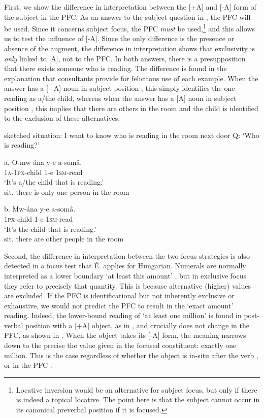 \documentclass[output=paper]{langsci/langscibook}
\begin{document}
  First, we show the difference in interpretation between the [+A] and [-A] form of the subject in the PFC. As an answer to the subject question in , the PFC will be used. Since it concerns subject focus, the PFC \textit{must} be used,\footnote{Locative inversion would be an alternative for subject focus, but only if there is indeed a topical locative. The point here is that the subject cannot occur in its canonical preverbal position if it is focused.} and this allows us to test the influence of [-A]. Since the only difference is the presence or absence of the augment, the difference in interpretation shows that exclusivity is \textit{only} linked to [A], not to the PFC. In both answers, there is a presupposition that there exists someone who is reading. The difference is found in the explanation that consultants provide for felicitous use of each example. When the answer has a [+A] noun in subject position , this simply identifies the one reading as a/the child, whereas when the answer has a [A] noun in subject position , this implies that there are others in the room and the child is identified to the exclusion of these alternatives.

\ea
{sketched situation: I want to know who is reading in the room next door}
\glt   Q: ‘Who is reading?’
\z

\ea
\gll   a.  O-mw-ána  y-e  a-somâ.\\
         \textsc{1a}-\textsc{1px}-child  1-e  \textsc{1sm}-read\\
\glt     ‘It’s a/the child that is reading.’\\
sit. there is only one person in the room
\z

\ea
\gll   b.  Mw-ána  y-e  a-somâ.\\
         \textsc{1px}-child  1-e  \textsc{1sm}-read\\
\glt   ‘It’s the child that is reading.’\\
sit. there are other people in the room
\z

Second, the difference in interpretation between the two focus strategies is also detected in a focus test that É. \citet{Kiss2009} applies for Hungarian. Numerals are normally interpreted as a lower boundary ‘at least this amount’ \citep{Horn1972,Levinson2000}, but in exclusive focus they refer to precisely that quantity. This is because alternative (higher) values are excluded. If the PFC is identificational but not inherently exclusive or exhaustive, we would not predict the PFC to result in the ‘exact amount’ reading. Indeed, the lower-bound reading of ‘at least one million’ is found in post-verbal position with a [+A] object, as in , and crucially does not change in the PFC, as shown in . When the object takes its [-A] form, the meaning narrows down to the precise the value given in the focused constituent: exactly one million. This is the case regardless of whether the object is in-situ after the verb , or in the PFC .
\end{document}

